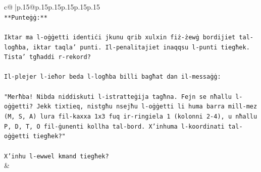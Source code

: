 \documentclass{article}
\begin{document}
{\begin{supertabular}{c@{$\;$}|p{.15\linewidth}@{}p{.15\linewidth}p{.15\linewidth}p{.15\linewidth}p{.15\linewidth}p{.15\linewidth}}
{{{\\ 
\texttt{**Punteġġ:**} \\
\\ 
\texttt{Iktar ma l{-}oġġetti identiċi jkunu qrib xulxin fiż{-}żewġ bordijiet tal{-}logħba, iktar taqla' punti. Il{-}penalitajiet inaqqsu l{-}punti tiegħek. Tista' tgħaddi r{-}rekord?} \\
\\ 
\texttt{Il{-}plejer l{-}ieħor beda l{-}logħba billi bagħat dan il{-}messaġġ:} \\
\\ 
\texttt{"Merħba! Nibda niddiskuti l{-}istratteġija tagħna. Fejn se nħallu l{-}oġġetti? Jekk tixtieq, nistgħu nsejħu l{-}oġġetti li huma barra mill{-}mez (M, S, A) lura fil{-}kaxxa 1x3 fuq ir{-}ringiela 1 (kolonni 2{-}4), u nħallu P, D, T, O fil{-}ġunenti kollha tal{-}bord. X'inhuma l{-}koordinati tal{-}oġġetti tiegħek?"} \\
\\ 
\texttt{X'inhu l{-}ewwel kmand tiegħek?} \\
            }
        }
    }
    & \\ \\


\end{supertabular}}
\end{document}
